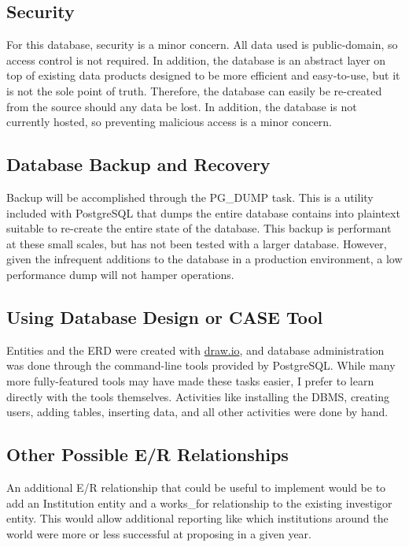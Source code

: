 \documentclass[a4paper,11pt]{article}
\begin{document}
\subsection{Security}
For this database, security is a minor concern.  All data used is public-domain, so access control is not required.  In addition, the database is an abstract layer on top of existing data products designed to be more efficient and easy-to-use, but it is not the sole point of truth.  Therefore, the database can easily be re-created from the source should any data be lost.  In addition, the database is not currently hosted, so preventing malicious access is a minor concern.

\subsection{Database Backup and Recovery}
Backup will be accomplished through the PG\_DUMP task.  This is a utility included with PostgreSQL that dumps the entire database contains into plaintext suitable to re-create the entire state of the database.  This backup is performant at these small scales, but has not been tested with a larger database.  However, given the infrequent additions to the database in a production environment, a low performance dump will not hamper operations.  

\subsection{Using Database Design or CASE Tool}
Entities and the ERD were created with \href{https://draw.io}{draw.io}, and database administration was done through the command-line tools provided by PostgreSQL.  While many more fully-featured tools may have made these tasks easier, I prefer to learn directly with the tools themselves.  Activities like installing the DBMS, creating users, adding tables, inserting data, and all other activities were done by hand. 

\subsection{Other Possible E/R Relationships}
An additional E/R relationship that could be useful to implement would be to add an Institution entity and a works\_for relationship to the existing investigor entity.  This would allow additional reporting like which institutions around the world were more or less successful at proposing in a given year. 
\end{document}
